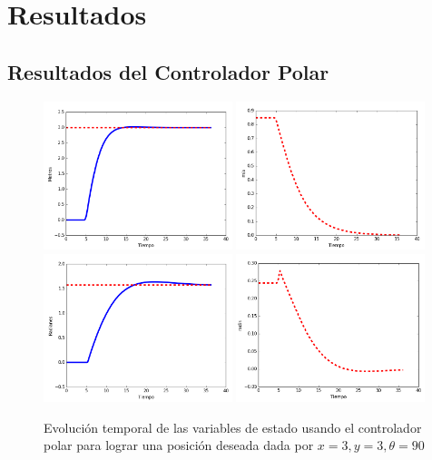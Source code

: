 \chapter{Resultados}
\section {Resultados del Controlador Polar}
\begin{figure}%
  \centering \footnotesize
  \includegraphics[width=0.49\textwidth]{images/tvsxy_tesis.png}
  \includegraphics[width=0.49\textwidth]{images/tvsv_tesis.png}
  \includegraphics[width=0.49\textwidth]{images/tvstheta_tesis.png}
  \includegraphics[width=0.49\textwidth]{images/tvsomega_tesis.png}
  \captionsetup{font=footnotesize}
  \caption{Evolución temporal de las variables de estado usando el controlador polar 
  para lograr una posición deseada dada por $x = 3, y = 3, \theta = 90$}
  \label{f:PolarControl}
\end{figure}
